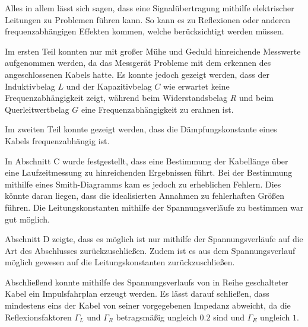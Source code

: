 Alles in allem lässt sich sagen, dass eine Signalübertragung mithilfe elektrischer Leitungen zu Problemen führen kann. 
So kann es zu Reflexionen oder anderen frequenzabhängigen Effekten kommen, welche berücksichtigt werden müssen.

Im ersten Teil konnten nur mit großer Mühe und Geduld hinreichende Messwerte aufgenommen werden, da das Messgerät Probleme mit dem erkennen des angeschlossenen Kabels hatte.
Es konnte jedoch gezeigt werden, dass der Induktivbelag $L$ und der Kapazitivbelag $C$ wie erwartet keine Frequenzabhängigkeit zeigt, während beim Widerstandsbelag $R$ und beim Querleitwertbelag $G$ eine Frequenzabhängigkeit zu erahnen ist.

Im zweiten Teil konnte gezeigt werden, dass die Dämpfungskonstante eines Kabels frequenzabhängig ist.

In Abschnitt C wurde festgestellt, dass eine Bestimmung der Kabellänge über eine Laufzeitmessung zu hinreichenden Ergebnissen führt.
Bei der Bestimmung mithilfe eines Smith-Diagramms kam es jedoch zu erheblichen Fehlern.
Dies könnte daran liegen, dass die idealisierten Annahmen zu fehlerhaften Größen führen.
Die Leitungskonstanten mithilfe der Spannungsverläufe zu bestimmen war gut möglich.

Abschnitt D zeigte, dass es möglich ist nur mithilfe der Spannungsverläufe auf die Art des Abschlusses zurückzuschließen.
Zudem ist es aus dem Spannungsverlauf möglich gewesen auf die Leitungskonstanten zurückzuschließen.

Abschließend konnte mithilfe des Spannungsverlaufs von in Reihe geschalteter Kabel ein Impulsfahrplan erzeugt werden.
Es lässt darauf schließen, dass mindestens eins der Kabel von seiner vorgegebenen Impedanz abweicht, da die Reflexionsfaktoren $\Gamma_L$ und $\Gamma_R$ betragsmäßig ungleich $0.2$ sind und $\Gamma_E$ ungleich $1$.

